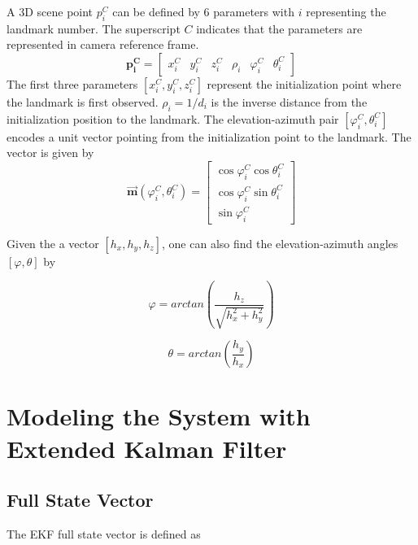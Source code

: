 \noindent A 3D scene point $p_{i}^{C}$ can be defined by 6 parameters
with $i$ representing the landmark number. The superscript $C$
indicates that the parameters are represented in camera reference frame.
\begin{equation}
\mathbf{p_{i}^{C}}=\begin{bmatrix}
x_{i}^{C} & y_{i}^{C} & z_{i}^{C} & \rho _{i} & \varphi _{i}^{C} & 
\theta _{i}^{C} 
\end{bmatrix}
\end{equation}
The first three parameters $[x_{i}^{C}, y_{i}^{C}, z_{i}^{C}]$
represent the initialization point where the landmark is first observed.
$\rho_{i} = 1/d_i$ is the inverse distance from the initialization position
to the landmark. The elevation-azimuth pair $[\varphi_{i}^{C},
\theta_{i}^{C}]$ encodes a unit vector pointing from the
initialization point to the landmark. The vector is given by
\begin{equation}
\label{eq:m}
\vec{\mathbf{m}}(\varphi_{i}^{C}, \theta_{i}^{C})=\begin{bmatrix}
\cos\varphi_{i}^{C}\cos\theta _{i}^{C} \\
\cos\varphi_{i}^{C}\sin\theta _{i}^{C} \\
\sin\varphi_{i}^{C}
\end{bmatrix}
\end{equation}

\noindent Given the a vector $[h_x, h_y, h_z]$, one can also find the
elevation-azimuth angles $[\varphi, \theta]$ by

\begin{equation}
\label{eq:m_inv_varphi}
\varphi 
=arctan\left(\frac{h_{z}}{\sqrt{h_x^2+h_y^2}}\right)
\end{equation}

\begin{equation}
\label{eq:m_inv_theta}
\theta =arctan\left(\frac{h_{y}}{h_{x}}\right)
\end{equation}


\section{Modeling the System with Extended Kalman 
Filter}

\subsection{Full State Vector}

The EKF full state vector is defined as 


